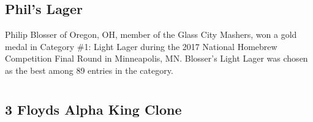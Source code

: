 \documentclass[10pt,oneside]{scrbook}
\begin{document}
\chapter*{Phil's Lager}

\begin{aboutblock}
Philip Blosser of Oregon, OH, member of the Glass City Mashers, won a gold medal in
Category \#1: Light Lager during the 2017 National Homebrew Competition Final Round in
Minneapolis, MN. Blosser’s Light Lager was chosen as the best among 89 entries in the
category.
\end{aboutblock}


\begin{methodandtiming}
  
\begin{mashsteps}
\end{mashsteps}

\begin{fermentationsteps}
\end{fermentationsteps}

\end{methodandtiming}

\pagebreak

\begin{ingredientsblock}

\begin{malts}
\end{malts}

\begin{hops}
\end{hops}

\begin{yeasts}
\end{yeasts}

\end{ingredientsblock}

\part{\styleamericanpaleale}

\chapter*{3 Floyds Alpha King Clone}
\end{document}
